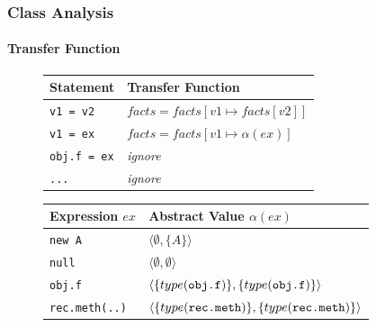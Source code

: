 \documentclass[hyperref={pdfpagelabels=false}]{beamer}
\begin{document}
\begin{frame}[fragile]
    \frametitle{Class Analysis}
    \framesubtitle{Transfer Function}

    \begin{figure}
        \begin{tabular}{ l | l }
            Statement             & Transfer Function\\
            \hline
            \verb/v1 = v2/        & $facts = facts[v1 \mapsto facts[v2]]$ \\
            \verb/v1 = ex/        & $facts = facts[v1 \mapsto \alpha(ex)]$ \\
            \verb/obj.f = ex/     & \emph{ignore} \\
            \verb/.../            & \emph{ignore} \\
        \end{tabular}
    \end{figure}

    \begin{figure}
        \begin{tabular}{ l | l }
            Expression $ex$       & Abstract Value $\alpha(ex)$\\
            \hline
            \verb/new A/          & $\langle \emptyset, \{ A \} \rangle$ \\
            \verb/null/           & $\langle \emptyset, \emptyset \rangle$ \\
            \verb/obj.f/          & $\langle\{type(\verb/obj.f/)\}, \{type(\verb/obj.f/)\} \rangle$ \\
            \verb/rec.meth(..)/   & $\langle\{type(\verb/rec.meth/)\}, \{type(\verb/rec.meth/)\} \rangle$ \\
        \end{tabular}
    \end{figure}
\end{frame}
\end{document}
